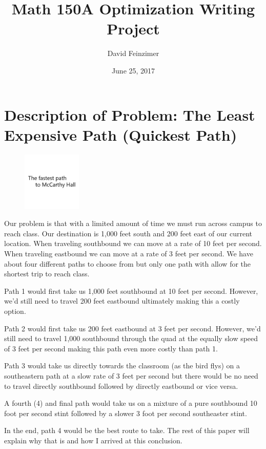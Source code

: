 \documentclass{article}
\title{Math 150A Optimization Writing Project}
\author{David Feinzimer}
\date{June 25, 2017}
\begin{document}
\maketitle

\section{Description of Problem: The Least Expensive Path (Quickest Path)}

\begin{figure}
    \centering
    \includegraphics[width=0.25\textwidth]{title}
\end{figure}

Our problem is that with a limited amount of time we must run across campus to reach class.
Our destination is 1,000 feet south and 200 feet east of our current location.
When traveling southbound we can move at a rate of 10 feet per second.
When traveling eastbound we can move at a rate of 3 feet per second.
We have about four different paths to choose from but only one path with allow for the shortest trip to reach class.

Path 1 would first take us 1,000 feet southbound at 10 feet per second. However, we'd still need to travel 200 feet eastbound ultimately making this a costly option.

Path 2 would first take us 200 feet eastbound at 3 feet per second. However, we'd still need to travel 1,000 southbound through the quad at the equally slow speed of 3 feet per second making this path even more costly than path 1.

Path 3 would take us directly towards the classroom (as the bird flys) on a southeastern path at a slow rate of 3 feet per second but there would be no need to travel directly southbound followed by directly eastbound or vice versa.

A fourth (4) and final path would take us on a mixture of a pure southbound 10 foot per second stint followed by a slower 3 foot per second southeaster stint.

In the end, path 4 would be the best route to take. The rest of this paper will explain why that is and how I arrived at this conclusion.
\end{document}
